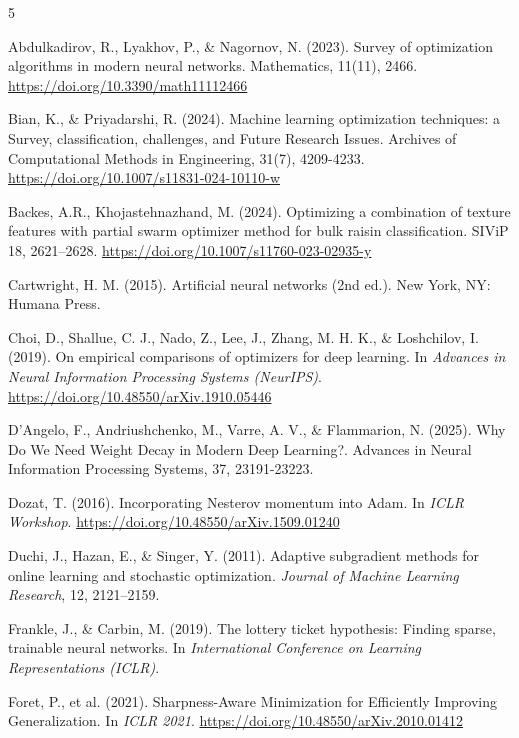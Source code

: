 \documentclass[10pt,twocolumn]{article}
\begin{document}
\begin{thebibliography}{5}

Abdulkadirov, R., Lyakhov, P., \& Nagornov, N. (2023). Survey of optimization algorithms in modern neural networks. Mathematics, 11(11), 2466. \url{https://doi.org/10.3390/math11112466}

Bian, K., \& Priyadarshi, R. (2024). Machine learning optimization techniques: a Survey, classification, challenges, and Future Research Issues. Archives of Computational Methods in Engineering, 31(7), 4209-4233. \url{https://doi.org/10.1007/s11831-024-10110-w}

Backes, A.R., Khojastehnazhand, M. (2024).  Optimizing a combination of texture features with partial swarm optimizer method for bulk raisin classification. SIViP 18, 2621–2628. \url{https://doi.org/10.1007/s11760-023-02935-y}

Cartwright, H. M. (2015). Artificial neural networks (2nd ed.). New York, NY: Humana Press. 

Choi, D., Shallue, C. J., Nado, Z., Lee, J., Zhang, M. H. K., \& Loshchilov, I. (2019). On empirical comparisons of optimizers for deep learning. In \textit{Advances in Neural Information Processing Systems (NeurIPS)}. \url{https://doi.org/10.48550/arXiv.1910.05446}

D'Angelo, F., Andriushchenko, M., Varre, A. V., \& Flammarion, N. (2025). Why Do We Need Weight Decay in Modern Deep Learning?. Advances in Neural Information Processing Systems, 37, 23191-23223.

Dozat, T. (2016). Incorporating Nesterov momentum into Adam. In \textit{ICLR Workshop}. \url{https://doi.org/10.48550/arXiv.1509.01240}

Duchi, J., Hazan, E., \& Singer, Y. (2011). Adaptive subgradient methods for online learning and stochastic optimization. \textit{Journal of Machine Learning Research}, 12, 2121--2159.

Frankle, J., \& Carbin, M. (2019). The lottery ticket hypothesis: Finding sparse, trainable neural networks. In \textit{International Conference on Learning Representations (ICLR)}.

Foret, P., et al. (2021). Sharpness-Aware Minimization for Efficiently Improving Generalization. In \textit{ICLR 2021}. \url{https://doi.org/10.48550/arXiv.2010.01412}


\end{thebibliography}
\end{document}
